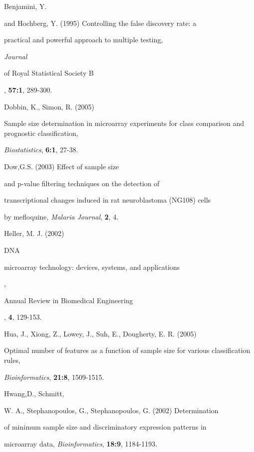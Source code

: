 \documentclass[12pt]{article}
\begin{document}
\begin{thebibliography}{}



 Benjamini, Y.

  and Hochberg, Y. (1995) Controlling the false discovery rate: a

  practical and powerful approach to multiple testing, {\it Journal

  of Royal Statistical Society B}, {\bf 57:1}, 289-300.



 Dobbin, K., Simon, R. (2005)

  Sample size determination in microarray experiments for class comparison and prognostic classification,

  {\it Biostatistics}, {\bf 6:1}, 27-38.



 Dow,G.S. (2003) Effect of sample size

  and p-value filtering techniques on the detection of

  transcriptional changes induced in rat neuroblastoma (NG108) cells

  by mefloquine, {\it Malaria Journal}, {\bf 2}, 4.



 Heller, M. J. (2002) {DNA

  microarray technology: devices, systems, and applications}, {\it

  Annual Review in Biomedical Engineering}, {\bf 4}, 129-153.



 Hua, J., Xiong, Z., Lowey, J., Suh, E., Dougherty, E. R. (2005)

  Optimal number of features as a function of sample size for various classification rules,

  {\it Bioinformatics}, {\bf 21:8}, 1509-1515.



 Hwang,D., Schmitt,

  W. A., Stephanopoulos, G., Stephanopoulos, G. (2002) Determination

  of minimum sample size and discriminatory expression patterns in

  microarray data, {\it Bioinformatics}, {\bf 18:9}, 1184-1193.




\end{thebibliography}
\end{document}
